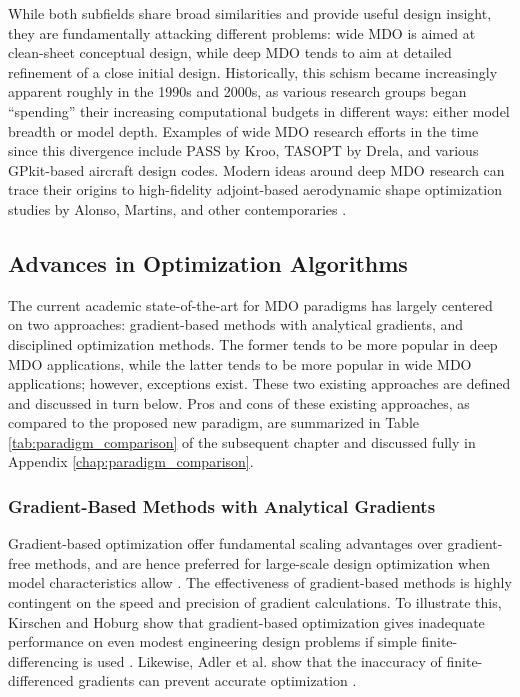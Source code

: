 While both subfields share broad similarities and provide useful design insight, they are fundamentally attacking different problems: wide MDO is aimed at clean-sheet conceptual design, while deep MDO tends to aim at detailed refinement of a close initial design. Historically, this schism became increasingly apparent roughly in the 1990s and 2000s, as various research groups began ``spending'' their increasing computational budgets in different ways: either model breadth or model depth. Examples of wide MDO research efforts in the time since this divergence include PASS \cite{antoine_framework_2005} by Kroo, TASOPT \cite{drela_tasopt_2010} by Drela, and various GPkit-based \cite{hoburg_geometric_2014} aircraft design codes. Modern ideas around deep MDO research can trace their origins to high-fidelity adjoint-based aerodynamic shape optimization studies by Alonso, Martins, and other contemporaries \cite{alonso_pymdo_2004, martins_coupledadjoint_2005, choi_multifidelity_2008}.

\subsection{Advances in Optimization Algorithms}

The current academic state-of-the-art for MDO paradigms has largely centered on two approaches: gradient-based methods with analytical gradients, and disciplined optimization methods. The former tends to be more popular in deep MDO applications, while the latter tends to be more popular in wide MDO applications; however, exceptions exist. These two existing approaches are defined and discussed in turn below. Pros and cons of these existing approaches, as compared to the proposed new paradigm, are summarized in Table \ref{tab:paradigm_comparison} of the subsequent chapter and discussed fully in Appendix \ref{chap:paradigm_comparison}.

\subsubsection{Gradient-Based Methods with Analytical Gradients}

Gradient-based optimization offer fundamental scaling advantages over gradient-free methods, and are hence preferred for large-scale design optimization when model characteristics allow \cite{lyu_benchmarking_2014, martins_engineering_2021}. The effectiveness of gradient-based methods is highly contingent on the speed and precision of gradient calculations. To illustrate this, Kirschen and Hoburg show that gradient-based optimization gives inadequate performance on even modest engineering design problems if simple finite-differencing is used \cite{kirschen}. Likewise, Adler et al. show that the inaccuracy of finite-differenced gradients can prevent accurate optimization \cite{adler_cfd_2022}.

